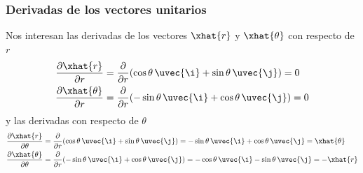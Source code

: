 \subsubsection{Derivadas de los vectores unitarios}
Nos interesan las derivadas de los vectores $\xhat{r}$ y $\xhat{\theta}$ con respecto de
$r$
\begin{subequations}
\begin{align}\label{eq:R2-partial-versor_r-r}
  \dfrac{\partial\xhat{r}}{\partial r}
  &=
  \dfrac{\partial}{\partial r}(\cos\theta\,\uvec{\i}+\sin\theta\,\uvec{\j})
  = 0\\
  \label{eq:R2-partial-versor_theta-r}
  \dfrac{\partial\xhat{\theta}}{\partial r}
  &=
  \dfrac{\partial}{\partial r}(-\sin\theta\,\uvec{\i}+\cos\theta\,\uvec{\j})
  = 0
\end{align}
\end{subequations}
y las derivadas con respecto de $\theta$
\begin{subequations}
\begin{align}\label{eq:R2-partial-versor_r-theta}
  \dfrac{\partial\xhat{r}}{\partial\theta}
  &=
  \dfrac{\partial}{\partial r}(\cos\theta\,\uvec{\i}+\sin\theta\,\uvec{\j})  
  = -\sin\theta\,\uvec{\i} + \cos\theta\,\uvec{\j} = \xhat{\theta}\\
  \label{eq:R2-partial-versor_theta-theta}
  \dfrac{\partial\xhat{\theta}}{\partial\theta}
  &=
  \dfrac{\partial}{\partial r}(-\sin\theta\,\uvec{\i}+\cos\theta\,\uvec{\j})  
  = -\cos\theta\,\uvec{\i} - \sin\theta\,\uvec{\j} = -\xhat{r}
\end{align}
\end{subequations}

